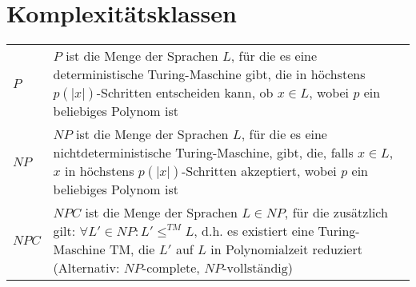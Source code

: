 \section{Komplexitätsklassen}
\begin{tabularx}{\textwidth}{ p{} | X }
	$P$ & $P$ ist die Menge der Sprachen $L$, für die es eine deterministische Turing-Maschine gibt, die in höchstens $p(\vert x \vert)$-Schritten entscheiden kann,
	ob ${x \in L}$, wobei $p$ ein beliebiges Polynom ist\\
	$NP$ & $NP$ ist die Menge der Sprachen $L$, für die es eine nichtdeterministische Turing-Maschine, gibt, die, falls ${x \in L}$, $x$ in höchstens
	$p(\vert x \vert)$-Schritten akzeptiert, wobei $p$ ein beliebiges Polynom ist\\
	$NPC$ & $NPC$ ist die Menge der Sprachen $L \in NP$, für die zusätzlich gilt: ${\forall L' \in NP : L' \leq^{TM} L}$, d.h. es existiert eine Turing-Maschine TM,
	die $L'$ auf $L$ in Polynomialzeit reduziert (Alternativ: $NP\text{-complete}$, $NP\text{-vollständig}$)\\
\end{tabularx}


